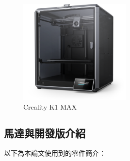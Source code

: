 \documentclass[class=NCU_thesis, crop=false]{standalone}
\begin{document}
\begin{figure}[htbp]
    \centering
    \includegraphics[width=0.5\textwidth]{figures/creality-k1-max.png}
\caption{Creality K1 MAX~\cite{creality_echo_dot}}
\end{figure}

\subsection{馬達與開發版介紹}
以下為本論文使用到的零件簡介：
\end{document}
